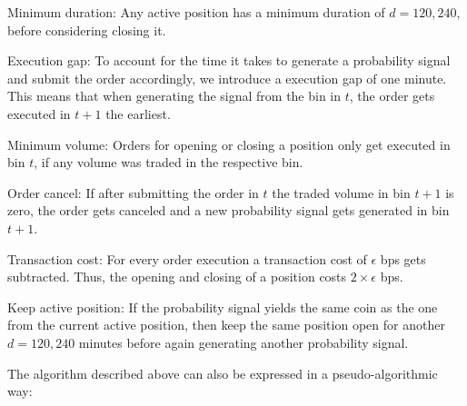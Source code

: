 \begin{basedescript}{%
    \desclabelstyle{\multilinelabel}
    }
    \item[Minimum duration:] {
        Any active position has a minimum duration of $ d = 120, 240 $, before considering closing it.
    }
    \item[Execution gap:] {
        To account for the time it takes to generate a probability signal and submit the order accordingly,
        we introduce a execution gap of one minute. This means that when generating the signal from the bin in $ t $,
        the order gets executed in $ t + 1 $ the earliest.
    }
    \item[Minimum volume:] { 
        Orders for opening or closing a position only get executed in bin $ t $, 
        if any volume was traded in the respective bin.
    }
    \item[Order cancel:] {
        If after submitting the order in $ t $ the traded volume in bin $ t + 1 $
        is zero, the order gets canceled and a new probability signal gets generated in bin $ t + 1 $.
    }
    \item[Transaction cost:] {
        For every order execution a transaction cost of $ \epsilon $ bps gets subtracted. 
        Thus, the opening and closing of a position costs $ 2 \times \epsilon $ bps.
    }
    \item[Keep active position:] {
        If the probability signal yields the same coin as the one from the current active position,
        then keep the same position open for another $ d=120, 240 $ minutes before again generating another
        probability signal.
    }
\end{basedescript}


The algorithm described above can also be expressed in a pseudo-algorithmic way:

